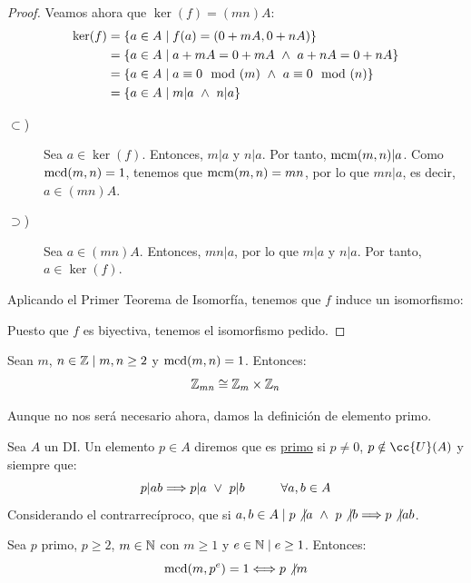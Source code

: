 \begin{teo}
\begin{proof}
    Veamos ahora que $\ker(f) = (mn)A$:
    \begin{align*}
        \ker(f) &= \{a \in A \mid f(a) = (0+mA, 0+nA)\} \\
        &= \{a \in A \mid a+mA=0+mA \ \land \  a+nA = 0+nA\} \\
        &= \{a \in A \mid a\equiv 0\mod(m) \ \land \  a\equiv 0\mod(n)\} \\
        &= \{a \in A \mid m|a \ \land \  n|a \}
    \end{align*}
    \begin{description}
        \item[$\subset$)] Sea $a \in \ker(f)$. Entonces, $m|a$ y $n|a$. Por tanto, $\operatorname{mcm}(m,n)|a$. Como $\operatorname{mcd}(m,n)=1$, tenemos que $\operatorname{mcm}(m,n) = mn$, por lo que $mn|a$, es decir, $a \in (mn)A$.
        \item[$\supset$)] Sea $a \in (mn)A$. Entonces, $mn|a$, por lo que $m|a$ y $n|a$. Por tanto, $a \in \ker(f)$.
    \end{description}

    
    Aplicando el Primer Teorema de Isomorfía, tenemos que $f$ induce un isomorfismo:

    Puesto que $f$ es biyectiva, tenemos el isomorfismo pedido.
\end{proof}
\end{teo}


\begin{coro}
    Sean $m$, $n \in \mathbb Z \mid m,n \geq 2$ y $\operatorname{mcd}(m,n) = 1$. Entonces:
    $$\mathbb Z_{mn} \cong \mathbb Z_m \times \mathbb Z_n$$
\end{coro}

Aunque no nos será necesario ahora, damos la definición de elemento primo.
\begin{definicion}[Primo]
    \label{defPrimo}
    Sea $A$ un DI. Un elemento $p \in A$ diremos que es \underline{primo} si $p \neq 0$, $p \notin \cc{U}(A)$ y siempre que:
    $$p|ab \Longrightarrow p|a \ \lor \  p|b\hspace{1cm}\forall a,b \in A$$
    Considerando el contrarrecíproco, que si $a,b \in A \mid p\not|a \ \land \  p\not|b \Longrightarrow p\not|ab$.
\end{definicion}

\begin{lema}
    \label{lemaParaPropEuler}
    Sea $p$ primo, $p\geq 2$, $m \in \mathbb N$ con $m \geq 1$ y $e \in \mathbb N \mid e \geq 1$. Entonces:
    $$\operatorname{mcd}(m,p^e) = 1 \Longleftrightarrow p\not|m$$
\end{lema}

